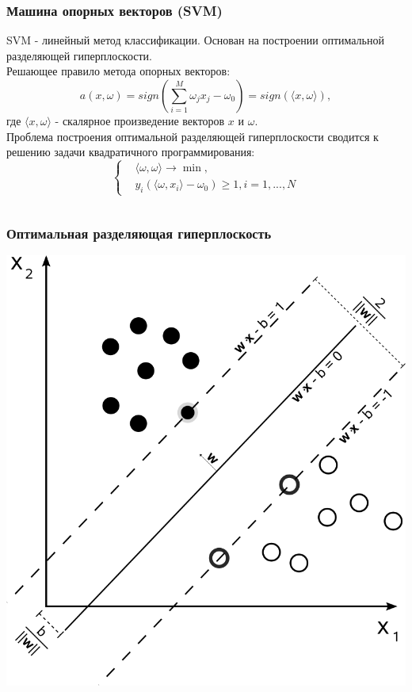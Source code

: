 \documentclass{beamer}
\begin{document}
\begin{frame}
	\frametitle{Машина опорных векторов (SVM)}
	SVM - линейный метод классификации. Основан на построении оптимальной разделяющей гиперплоскости.\\
	Решающее правило метода опорных векторов: $$a(x,\omega)=sign\left(\sum\limits_{i=1}^M\omega_j x_j-\omega_0\right)=sign\left(\langle x,\omega \rangle\right),$$ где $\langle x,\omega \rangle$ - скалярное произведение векторов $x$ и $\omega$.
	\\

	Проблема построения оптимальной разделяющей гиперплоскости сводится к решению задачи квадратичного программирования:
	\begin{equation*}
		\begin{cases}
			&\langle\omega,\omega\rangle\rightarrow\min, \\
			&y_i(\langle\omega,x_i\rangle-\omega_0)\ge1, i=1,...,N
		\end{cases}
	\end{equation*}

	
	$$$$
\end{frame}

\begin{frame}
	\frametitle{Оптимальная разделяющая гиперплоскость}
	\begin{center}
		\includegraphics[width=\linewidth,height=.7\textheight,keepaspectratio]{svm_hyperplane.png}
	\end{center}
\end{frame}
\end{document}
